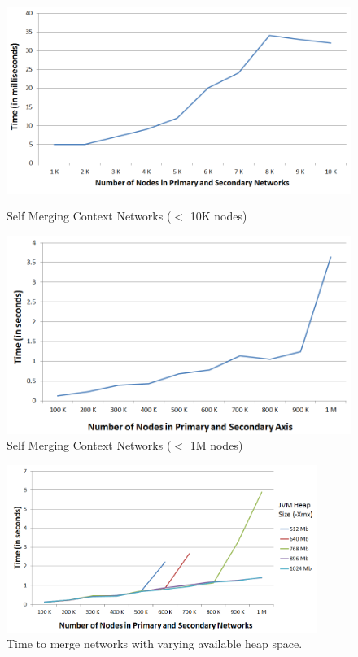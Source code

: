 \begin{figure}[ht]
\begin{minipage}[b]{0.45\linewidth}
\centering
\includegraphics[width=\textwidth]{media/chapter5/axis/perf/selfmerge_10K.png}
\caption{Self Merging Context Networks ($<$ 10K nodes)}
\label{fig:1k-self-merge}
\end{minipage}
\hspace{0.5cm}
\begin{minipage}[b]{0.45\linewidth}
\centering
\includegraphics[width=\textwidth]{media/chapter5/axis/perf/selfmerge_1M.png}
\caption{Self Merging Context Networks ($<$ 1M nodes)}
\label{fig:1m-self-merge}
\end{minipage}
\end{figure}

\begin{figure}[t]
\centering
\includegraphics[width=0.9\textwidth]{media/chapter5/axis/perf/selfmerge-increasing-xmx.png}
\caption{Time to merge networks with varying available heap space.}
\label{fig:agg-xmx}
\end{figure}


